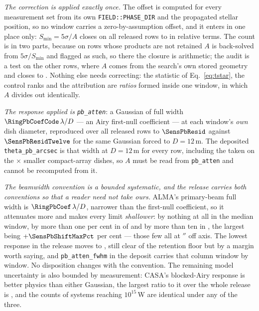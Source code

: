 \emph{The correction is applied exactly once.} The offset is computed for
every measurement set from its own \texttt{FIELD::PHASE\_DIR} and the
propagated stellar position, so no window carries a zero-by-assumption
offset, and it enters in one place only: $S_{\min}=5\sigma/A$ closes on all
\PbSminClosed{} released rows to \PbSminWorstRes{} in relative terms. The
count is in two parts, because on \PbSminTaut{} rows whose products are not
retained $A$ is back-solved from $5\sigma/S_{\min}$ and flagged as such, so
there the closure is arithmetic; the audit is a test on the other
\PbSminIndep{} rows, where $A$ comes from the search's own stored geometry and
closes to \PbSminIndepRes. Nothing else needs correcting: the statistic of
Eq.~\ref{eq:tstar}, the control ranks and the attribution are \emph{ratios}
formed inside one window, in which $A$ divides out identically.

\emph{The response applied is \texttt{pb\_atten}}: a Gaussian of full width
$\RingPbCoefCode\,\lambda/D$ --- an Airy first-null coefficient --- at each
window's \emph{own} dish diameter, reproduced over all \NWindows{} released
rows to $\SensPbResid$ against $\SensPbResidTwelve$ for the same Gaussian
forced to $D=12$\,m. The deposited \texttt{theta\_pb\_arcsec} is that width
at $D=12$\,m for every row, including the \PbNAcaRow{} taken on the
\PbAcaRatio$\times$ smaller compact-array dishes, so $A$ must be read from
\texttt{pb\_atten} and cannot be recomputed from it.

\emph{The beamwidth convention is a bounded systematic, and the release
carries both conventions so that a reader need not take ours.} ALMA's
primary-beam full width is $\RingPbCoef\,\lambda/D$, narrower than the
first-null coefficient, so it attenuates more and makes every limit
\emph{shallower}: by nothing at all in the median window, by more than one
per cent in \SensPbNOnePct{} of \NWindows{} and by more than ten in
\SensPbNTenPct, the largest being $+\SensPbShiftMaxPct$ per cent --- those
few all \SensPbWorstStar{} at \SensPbWorstOff$''$ off axis. The lowest
response in the release moves \SensPbAMin{} to \SensPbAMinAlma, still clear
of the \SensPbFloor{} retention floor but by a margin worth saying, and
\texttt{pb\_atten\_fwhm} in the deposit carries that column window by window.
No disposition changes with the convention. The
remaining model uncertainty is also bounded by measurement: CASA's
blocked-Airy response is better physics than either Gaussian, the largest
ratio to it over the whole release is \PbModelMax, and the counts of systems
reaching $10^{15}$\,W are identical under any of the three.

